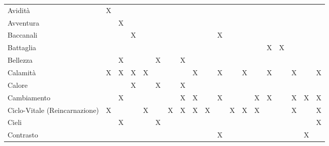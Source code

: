 \documentclass[10pt,a3paper]{memoir}
\begin{document}
\begin{table}[htpb]
\begin{tabular}{l|c|c|c|c|c|c|c|c|c|c|c|c|c|c|c|c|c|c}
Avidit\`{a} & X &  &  &  &  &  &  &  &  &  &  &  &  &  &  &  &  &  \\
Avventura &  & X &  &  &  &  &  &  &  &  &  &  &  &  &  &  &  &  \\
Baccanali &  &  & X &  &  &  &  &  &  & X &  &  &  &  &  &  &  &  \\
Battaglia &  &  &  &  &  &  &  &  &  &  &  &  &  & X & X &  &  &  \\
Bellezza &  & X &  &  & X &  & X &  &  &  &  &  &  &  &  &  &  &  \\
Calamit\`{a} & X & X & X & X &  &  &  & X &  & X &  & X &  & X &  & X &  & X \\
Calore &  &  & X &  & X &  & X &  &  &  &  &  &  &  &  &  &  &  \\
Cambiamento &  & X &  &  &  &  & X & X &  & X &  &  & X & X &  & X & X & X \\
Ciclo-Vitale (Reincarnazione) & X &  &  & X &  & X & X & X & X &  & X & X & X &  &  & X &  & X \\
Cieli &  & X &  &  & X &  &  &  &  &  &  &  &  &  &  &  &  & X \\
Contrasto &  &  &  &  &  &  &  &  &  & X &  &  &  &  &  &  & X &  \\
\bottomrule
\end{tabular}
\end{table}
\end{document}
